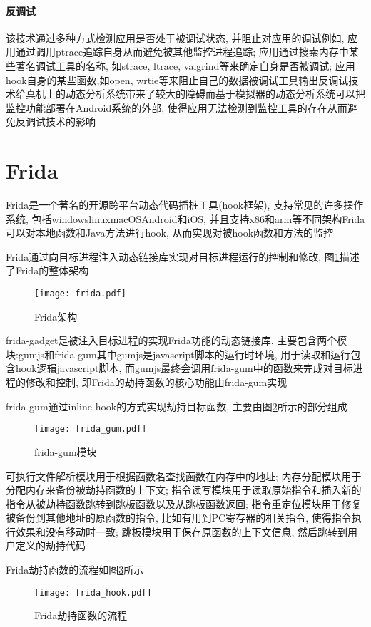 \paragraph*{反调试}
该技术通过多种方式检测应用是否处于被调试状态, 并阻止对应用的调试\juhao 例如, 应用通过调用ptrace追踪自身从而避免被其他监控进程追踪; 应用通过搜索内存中某些著名调试工具的名称, 如strace, ltrace, valgrind等来确定自身是否被调试; 应用hook自身的某些函数,如open, wrtie等来阻止自己的数据被调试工具输出\juhao 反调试技术给真机上的动态分析系统带来了较大的障碍而基于模拟器的动态分析系统可以把监控功能部署在Android系统的外部, 使得应用无法检测到监控工具的存在从而避免反调试技术的影响\juhao 

\section{Frida}
Frida是一个著名的开源跨平台动态代码插桩工具(hook框架), 支持常见的许多操作系统, 包括windows\dunhao linux\dunhao macOS\dunhao Android和iOS, 并且支持x86和arm等不同架构\juhao Frida可以对本地函数和Java方法进行hook, 从而实现对被hook函数和方法的监控\juhao 

Frida通过向目标进程注入动态链接库实现对目标进程运行的控制和修改, 图\ref{fridaArch}描述了Frida的整体架构\juhao 
\begin{figure}[ht]
	\centering
	\texttt{[image: frida.pdf]}
	\caption{Frida架构}
	\label{fridaArch}
\end{figure}

frida-gadget是被注入目标进程的实现Frida功能的动态链接库, 主要包含两个模块:gumjs和frida-gum\juhao 其中gumjs是javascript脚本的运行时环境, 用于读取和运行包含hook逻辑javascript脚本, 而gumjs最终会调用frida-gum中的函数来完成对目标进程的修改和控制, 即Frida的劫持函数的核心功能由frida-gum实现\juhao 

frida-gum通过inline hook的方式实现劫持目标函数, 主要由图\ref{fridaGum}所示的部分组成\juhao 
\begin{figure}[ht]
	\centering
	\texttt{[image: frida\_gum.pdf]}
	\caption{frida-gum模块}
	\label{fridaGum}
\end{figure}

可执行文件解析模块用于根据函数名查找函数在内存中的地址; 内存分配模块用于分配内存来备份被劫持函数的上下文; 指令读写模块用于读取原始指令和插入新的指令从被劫持函数跳转到跳板函数以及从跳板函数返回; 指令重定位模块用于修复被备份到其他地址的原函数的指令, 比如有用到PC寄存器的相关指令, 使得指令执行效果和没有移动时一致; 跳板模块用于保存原函数的上下文信息, 然后跳转到用户定义的劫持代码\juhao 

Frida劫持函数的流程如图\ref{fridaIntercept}所示\juhao 
\begin{figure}[ht]
	\centering
	\texttt{[image: frida\_hook.pdf]}
	\caption{Frida劫持函数的流程}
	\label{fridaIntercept}
\end{figure}





